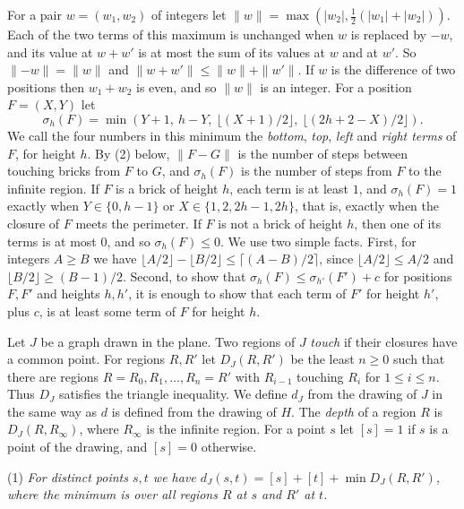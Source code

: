 {For a pair $w = (w_1, w_2)$ of integers let $\|w\| = \max(|w_2|, \frac{1}{2}(|w_1| + |w_2|))$. Each of the two terms of this maximum is unchanged when $w$ is replaced by $-w$, and its value at $w + w'$ is at most the sum of its values at $w$ and at $w'$. So $\|{-w}\| = \|w\|$ and $\|w + w'\| \le \|w\| + \|w'\|$. If $w$ is the difference of two positions then $w_1 + w_2$ is even, and so $\|w\|$ is an integer. For a position $F = (X, Y)$ let
\begin{equation*}
\sigma_h(F) = \min\left(Y + 1,\ h - Y,\ \lfloor (X + 1)/2 \rfloor,\ \lfloor (2h + 2 - X)/2 \rfloor\right).
\end{equation*}
We call the four numbers in this minimum the \textit{bottom}, \textit{top}, \textit{left} and \textit{right terms} of $F$, for height $h$. By (2) below, $\|F - G\|$ is the number of steps between touching bricks from $F$ to $G$, and $\sigma_h(F)$ is the number of steps from $F$ to the infinite region. If $F$ is a brick of height $h$, each term is at least $1$, and $\sigma_h(F) = 1$ exactly when $Y \in \{0, h - 1\}$ or $X \in \{1, 2, 2h - 1, 2h\}$, that is, exactly when the closure of $F$ meets the perimeter. If $F$ is not a brick of height $h$, then one of its terms is at most $0$, and so $\sigma_h(F) \le 0$. We use two simple facts. First, for integers $A \ge B$ we have $\lfloor A/2 \rfloor - \lfloor B/2 \rfloor \le \lceil (A - B)/2 \rceil$, since $\lfloor A/2 \rfloor \le A/2$ and $\lfloor B/2 \rfloor \ge (B - 1)/2$. Second, to show that $\sigma_h(F) \le \sigma_{h'}(F') + c$ for positions $F, F'$ and heights $h, h'$, it is enough to show that each term of $F'$ for height $h'$, plus $c$, is at least some term of $F$ for height $h$.

Let $J$ be a graph drawn in the plane. Two regions of $J$ \textit{touch} if their closures have a common point. For regions $R, R'$ let $D_J(R, R')$ be the least $n \ge 0$ such that there are regions $R = R_0, R_1, \dots, R_n = R'$ with $R_{i-1}$ touching $R_i$ for $1 \le i \le n$. Thus $D_J$ satisfies the triangle inequality. We define $d_J$ from the drawing of $J$ in the same way as $d$ is defined from the drawing of $H$. The \textit{depth} of a region $R$ is $D_J(R, R_\infty)$, where $R_\infty$ is the infinite region. For a point $s$ let $[s] = 1$ if $s$ is a point of the drawing, and $[s] = 0$ otherwise.

\hspace*{12pt}(1) \textit{For distinct points $s, t$ we have $d_J(s, t) = [s] + [t] + \min D_J(R, R')$, where the minimum is over all regions $R$ at $s$ and $R'$ at $t$.}

}
